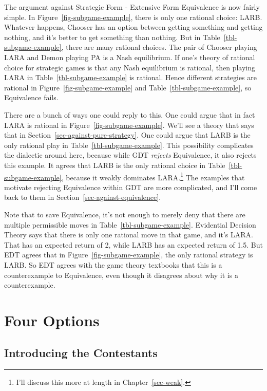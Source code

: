 \documentclass[
  12pt,
  letterpaper,
  DIV=11,
  numbers=noendperiod]{scrreprt}
\begin{document}
The argument against Strategic Form - Extensive Form Equivalence is now
fairly simple. In Figure~\ref{fig-subgame-example}, there is only one
rational choice: LARB. Whatever happens, Chooser has an option between
getting something and getting nothing, and it's better to get something
than nothing. But in Table~\ref{tbl-subgame-example}, there are many
rational choices. The pair of Chooser playing LARA and Demon playing PA
is a Nash equilibrium. If one's theory of rational choice for strategic
games is that any Nash equilibrium is rational, then playing LARA in
Table~\ref{tbl-subgame-example} is rational. Hence different strategies
are rational in Figure~\ref{fig-subgame-example} and
Table~\ref{tbl-subgame-example}, so Equivalence fails.

There are a bunch of ways one could reply to this. One could argue that
in fact LARA is rational in Figure~\ref{fig-subgame-example}. We'll see
a theory that says that in Section~\ref{sec-against-pure-strategy}. One
could argue that LARB is the only rational play in
Table~\ref{tbl-subgame-example}. This possibility complicates the
dialectic around here, because while GDT \emph{rejects} Equivalence, it
also rejects this example. It agrees that LARB is the only rational
choice in Table~\ref{tbl-subgame-example}, because it weakly dominates
LARA.\footnote{I'll discuss this more at length in
  Chapter~\ref{sec-weak}.} The examples that motivate rejecting
Equivalence within GDT are more complicated, and I'll come back to them
in Section~\ref{sec-against-equivalence}.

Note that to save Equivalence, it's not enough to merely deny that there
are multiple permissible moves in Table~\ref{tbl-subgame-example}.
Evidential Decision Theory says that there is only one rational move in
that game, and it's LARA. That has an expected return of 2, while LARB
has an expected return of 1.5. But EDT agrees that in
Figure~\ref{fig-subgame-example}, the only rational strategy is LARB. So
EDT agrees with the game theory textbooks that this is a counterexample
to Equivalence, even though it disagrees about why it is a
counterexample.

\hypertarget{sec-four-options}{%
\section{Four Options}\label{sec-four-options}}

\hypertarget{sec-contestants}{%
\subsection{Introducing the Contestants}\label{sec-contestants}}
\end{document}
